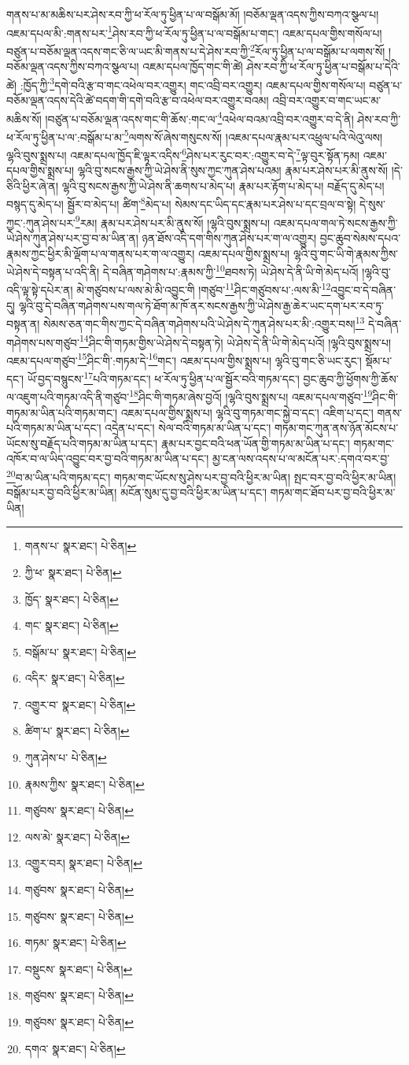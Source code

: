 གནས་པ་མ་མཆིས་པར་ཤེས་རབ་ཀྱི་ཕ་རོལ་ཏུ་ཕྱིན་པ་ལ་བསྒོམ་མོ། །བཅོམ་ལྡན་འདས་ཀྱིས་བཀའ་སྩལ་པ། འཇམ་དཔལ་མི་:གནས་པར་\footnote{གནས་པ་  སྣར་ཐང་།  པེ་ཅིན། }ཤེས་རབ་ཀྱི་ཕ་རོལ་ཏུ་ཕྱིན་པ་ལ་བསྒོམ་པ་གང་། འཇམ་དཔལ་གྱིས་གསོལ་པ། བཙུན་པ་བཅོམ་ལྡན་འདས་གང་ཅི་ལ་ཡང་མི་གནས་པ་དེ་ཤེས་རབ་ཀྱི་\footnote{ཀྱི་ཕ་  སྣར་ཐང་།  པེ་ཅིན། }རོལ་ཏུ་ཕྱིན་པ་ལ་བསྒོམ་པ་ལགས་སོ། །བཅོམ་ལྡན་འདས་ཀྱིས་བཀའ་སྩལ་པ། འཇམ་དཔལ་ཁྱོད་གང་གི་ཚེ། ཤེས་རབ་ཀྱི་ཕ་རོལ་ཏུ་ཕྱིན་པ་བསྒོམ་པ་དེའི་ཚེ། :ཁྱོད་ཀྱི་\footnote{ཁྱོད་  སྣར་ཐང་།  པེ་ཅིན། }དགེ་བའི་རྩ་བ་གང་འཕེལ་བར་འགྱུར། གང་འབྲི་བར་འགྱུར། འཇམ་དཔལ་གྱིས་གསོལ་པ། བཙུན་པ་བཅོམ་ལྡན་འདས་དེའི་ཚེ་བདག་གི་དགེ་བའི་རྩ་བ་འཕེལ་བར་འགྱུར་བའམ། འབྲི་བར་འགྱུར་བ་གང་ཡང་མ་མཆིས་སོ། །བཙུན་པ་བཅོམ་ལྡན་འདས་གང་གི་ཆོས་:གང་ལ་\footnote{གང་  སྣར་ཐང་།  པེ་ཅིན། }འཕེལ་བའམ་འབྲི་བར་འགྱུར་བ་དེ་ནི། ཤེས་རབ་ཀྱི་ཕ་རོལ་ཏུ་ཕྱིན་པ་ལ་:བསྒོམ་པ་མ་\footnote{བསྒོམ་པ་  སྣར་ཐང་།  པེ་ཅིན། }ལགས་སོ་ཞེས་གསུངས་སོ། །འཇམ་དཔལ་རྣམ་པར་འཕྲུལ་པའི་ལེའུ་ལས། ལྷའི་བུས་སྨྲས་པ། འཇམ་དཔལ་ཁྱོད་ཇི་ལྟར་འདིས་\footnote{འདིར་  སྣར་ཐང་།  པེ་ཅིན། }ཤེས་པར་རུང་བར་:འགྱུར་བ་དེ་\footnote{འགྱུར་བ་  སྣར་ཐང་།  པེ་ཅིན། }ལྟ་བུར་སྟོན་ཏམ། འཇམ་དཔལ་གྱིས་སྨྲས་པ། ལྷའི་བུ་སངས་རྒྱས་ཀྱི་ཡེ་ཤེས་ནི་སུས་ཀྱང་ཀུན་ཤེས་པའམ། རྣམ་པར་ཤེས་པར་མི་ནུས་སོ། །དེ་ཅིའི་ཕྱིར་ཞེ་ན། ལྷའི་བུ་སངས་རྒྱས་ཀྱི་ཡེ་ཤེས་ནི་ཆགས་པ་མེད་པ། རྣམ་པར་རྟོག་པ་མེད་པ། བརྗོད་དུ་མེད་པ། བསྙད་དུ་མེད་པ། སྦྱོར་བ་མེད་པ། ཚིག་\footnote{ཚིག་པ་  སྣར་ཐང་།  པེ་ཅིན། }མེད་པ། སེམས་དང་ཡིད་དང་རྣམ་པར་ཤེས་པ་དང་བྲལ་བ་སྟེ། དེ་སུས་ཀྱང་:ཀུན་ཤེས་པར་\footnote{ཀུན་ཤེས་པ་  པེ་ཅིན། }རམ། རྣམ་པར་ཤེས་པར་མི་ནུས་སོ། །ལྷའི་བུས་སྨྲས་པ། འཇམ་དཔལ་གལ་ཏེ་སངས་རྒྱས་ཀྱི་ཡེ་ཤེས་ཀུན་ཤེས་པར་བྱ་བ་མ་ཡིན་ན། ཉན་ཐོས་འདི་དག་གིས་ཀུན་ཤེས་པར་ག་ལ་འགྱུར། བྱང་ཆུབ་སེམས་དཔའ་རྣམས་ཀྱང་ཕྱིར་མི་ལྡོག་པ་ལ་གནས་པར་ག་ལ་འགྱུར། འཇམ་དཔལ་གྱིས་སྨྲས་པ། ལྷའི་བུ་གང་ཡི་གེ་རྣམས་ཀྱིས་ཡེ་ཤེས་དེ་བསྟན་པ་འདི་ནི། དེ་བཞིན་གཤེགས་པ་:རྣམས་ཀྱི་\footnote{རྣམས་ཀྱིས་  སྣར་ཐང་།  པེ་ཅིན། }ཐབས་ཏེ། ཡེ་ཤེས་དེ་ནི་ཡི་གེ་མེད་པའོ། །ལྷའི་བུ་འདི་ལྟ་སྟེ་དཔེར་ན། མེ་གཙུབས་པ་ལས་མེ་མི་འབྱུང་གི །གཙུབ་\footnote{གཙུབས་  སྣར་ཐང་།  པེ་ཅིན། }ཤིང་གཙུབས་པ་:ལས་མི་\footnote{ལས་མེ་  སྣར་ཐང་།  པེ་ཅིན། }འབྱུང་བ་དེ་བཞིན་དུ། ལྷའི་བུ་དེ་བཞིན་གཤེགས་པས་གལ་ཏེ་ཐོག་མ་ཁོ་ནར་སངས་རྒྱས་ཀྱི་ཡེ་ཤེས་རྒྱ་ཆེར་ཡང་དག་པར་རབ་ཏུ་བསྟན་ན། སེམས་ཅན་གང་གིས་ཀྱང་དེ་བཞིན་གཤེགས་པའི་ཡེ་ཤེས་དེ་ཀུན་ཤེས་པར་མི་:འགྱུར་བས།\footnote{འགྱུར་བར།  སྣར་ཐང་།  པེ་ཅིན། } དེ་བཞིན་གཤེགས་པས་གཙུབ་\footnote{གཙུབས་  སྣར་ཐང་།  པེ་ཅིན། }ཤིང་གི་གཏམ་གྱིས་ཡེ་ཤེས་དེ་བསྟན་ཏེ། ཡེ་ཤེས་དེ་ནི་ཡི་གེ་མེད་པའོ། །ལྷའི་བུས་སྨྲས་པ། འཇམ་དཔལ་གཙུབ་\footnote{གཙུབས་  སྣར་ཐང་།  པེ་ཅིན། }ཤིང་གི་:གཏམ་དེ་\footnote{གཏམ་  སྣར་ཐང་།  པེ་ཅིན། }གང་། འཇམ་དཔལ་གྱིས་སྨྲས་པ། ལྷའི་བུ་གང་ཅི་ཡང་རུང་། སྡོམ་པ་དང་། ཡོ་བྱད་བསྙུངས་\footnote{བསྡུངས་  སྣར་ཐང་།  པེ་ཅིན། }པའི་གཏམ་དང་། ཕ་རོལ་ཏུ་ཕྱིན་པ་ལ་སྦྱོར་བའི་གཏམ་དང་། བྱང་ཆུབ་ཀྱི་ཕྱོགས་ཀྱི་ཆོས་ལ་འཇུག་པའི་གཏམ་འདི་ནི་གཙུབ་\footnote{གཙུབས་  སྣར་ཐང་།  པེ་ཅིན། }ཤིང་གི་གཏམ་ཞེས་བྱའོ། །ལྷའི་བུས་སྨྲས་པ། འཇམ་དཔལ་གཙུབ་\footnote{གཙུབས་  སྣར་ཐང་།  པེ་ཅིན། }ཤིང་གི་གཏམ་མ་ཡིན་པའི་གཏམ་གང་། འཇམ་དཔལ་གྱིས་སྨྲས་པ། ལྷའི་བུ་གཏམ་གང་སྐྱེ་བ་དང་། འཇིག་པ་དང་། གནས་པའི་གཏམ་མ་ཡིན་པ་དང་། འདྲེན་པ་དང་། སེལ་བའི་གཏམ་མ་ཡིན་པ་དང་། གཏམ་གང་ཀུན་ནས་ཉོན་མོངས་པ་ཡོངས་སུ་བརྗོད་པའི་གཏམ་མ་ཡིན་པ་དང་། རྣམ་པར་བྱང་བའི་ཕན་ཡོན་གྱི་གཏམ་མ་ཡིན་པ་དང་། གཏམ་གང་འཁོར་བ་ལ་ཡིད་འབྱུང་བར་བྱ་བའི་གཏམ་མ་ཡིན་པ་དང་། མྱ་ངན་ལས་འདས་པ་ལ་མངོན་པར་:དགའ་བར་བྱ་\footnote{དགའ་  སྣར་ཐང་།  པེ་ཅིན། }བ་མ་ཡིན་པའི་གཏམ་དང་། གཏམ་གང་ཡོངས་སུ་ཤེས་པར་བྱ་བའི་ཕྱིར་མ་ཡིན། སྤང་བར་བྱ་བའི་ཕྱིར་མ་ཡིན། བསྒོམ་པར་བྱ་བའི་ཕྱིར་མ་ཡིན། མངོན་སུམ་དུ་བྱ་བའི་ཕྱིར་མ་ཡིན་པ་དང་། གཏམ་གང་ཐོབ་པར་བྱ་བའི་ཕྱིར་མ་ཡིན། 